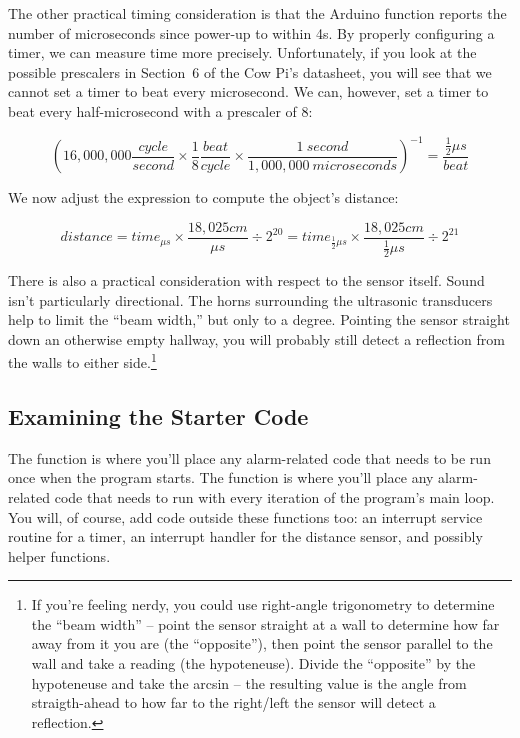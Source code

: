 The other practical timing consideration is that the Arduino function  reports the number of microseconds since power-up to within 4\textmu s.
By properly configuring a timer, we can measure time more precisely.
Unfortunately, if you look at the possible prescalers in Section~6 of the Cow Pi's datasheet, you will see that we cannot set a timer to beat every microsecond.
We can, however, set a timer to beat every half-microsecond with a prescaler of 8:

\[
    \left(16,000,000\frac{cycle}{second} \times \frac{1}{8}\frac{beat}{cycle} \times \frac{1~second}{1,000,000~microseconds}\right)^{-1} = \frac{\frac{1}{2}\mu s}{beat}
\]

We now adjust the expression to compute the object's distance:

\[
    distance = time_{\mu s} \times \frac{18,025 cm}{\mu s} \div 2^{20} = time_{\frac{1}{2}\mu s} \times \frac{18,025 cm}{\frac{1}{2}\mu s} \div 2^{21}
\]

There is also a practical consideration with respect to the sensor itself.
Sound isn't particularly directional.
The horns surrounding the ultrasonic transducers help to limit the ``beam width,'' but only to a degree.
Pointing the sensor straight down an otherwise empty hallway, you will probably still detect a reflection from the walls to either side.\footnote{
    If you're feeling nerdy, you could use right-angle trigonometry to determine the ``beam width'' --
    point the sensor straight at a wall to determine how far away from it you are (the ``opposite''), then point the sensor parallel to the wall and take a reading (the hypoteneuse).
    Divide the ``opposite'' by the hypoteneuse and take the arcsin -- the resulting value is the angle from straigth-ahead to how far to the right/left the sensor will detect a reflection.
}

\subsection{Examining the Starter Code}

The  function is where you'll place any alarm-related code that needs to be run once when the program starts.
The  function is where you'll place any alarm-related code that needs to run with every iteration of the program's main loop.
You will, of course, add code outside these functions too: an interrupt service routine for a timer, an interrupt handler for the distance sensor, and possibly helper functions.

